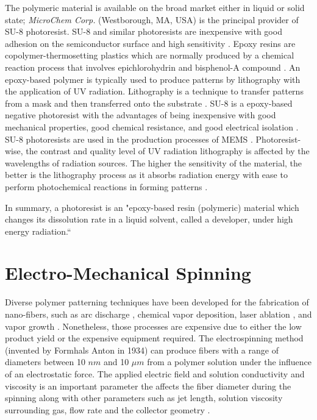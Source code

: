 The polymeric material is available on the broad market either in liquid or solid state; \emph{MicroChem Corp.} (Westborough, MA, USA) is the principal provider of SU-8 photoresist. SU-8 and similar photoresists are inexpensive with good adhesion on the semiconductor surface and high sensitivity \cite{Staab2011}. Epoxy resins are copolymer-thermosetting plastics which are normally produced by a chemical reaction process that involves epichlorohydrin and bisphenol-A compound \cite{Singla2010}. An epoxy-based polymer is typically used to produce patterns by lithography with the application of UV radiation. Lithography is a technique to transfer patterns from a mask and then transferred onto the substrate \cite{Landis2011,Xu2014}. SU-8 is a epoxy-based negative photoresist with the advantages of being inexpensive with good mechanical properties, good chemical resistance, and good electrical isolation \cite{Xu2014}. SU-8 photoresists are used in the production processes of MEMS \cite{Zhang2001}. Photoresist-wise, the contrast and quality level of UV radiation lithography is affected by the wavelengths of radiation sources. The higher the sensitivity of the material, the better is the lithography process as it absorbs radiation energy with ease to perform photochemical reactions in forming patterns \cite{Zhang2001}.

In summary, a photoresist is an "epoxy-based resin (polymeric) material which changes its dissolution rate in a liquid solvent, called a developer, under high energy radiation.`` \cite{Landis2011}

\section{Electro-Mechanical Spinning}
Diverse polymer patterning techniques have been developed for the fabrication of nano-fibers, such as arc discharge \cite{Wang2007}, chemical vapor deposition, laser ablation \cite{Ren1998}, and vapor growth \cite{Nadarajah2008}. Nonetheless, those processes are expensive due to either the low product yield or the expensive equipment required. The electrospinning method (invented by Formhals Anton in 1934) can produce fibers with a range of diameters between 10 $n m$ and 10 $\mu m$ \cite{Jayaraman2003,Anton1930} from a polymer solution under the influence of an electrostatic force. The applied electric field and solution conductivity and viscosity is an important parameter the affects the fiber diameter during the spinning along with other parameters such as jet length, solution viscosity surrounding gas, flow rate and the collector geometry \cite{Anton1938,Larrondo1981,Baumgarten1971,Shin2001}.

